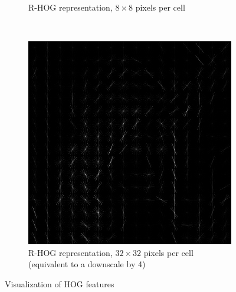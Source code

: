 \begin{figure}[h]
\begin{subfigure}[t]{0.3\textwidth}
        \caption{\acs{R-HOG} representation, $8\times8$ pixels per cell}
        \label{fig:lena_hog:8x8}
    \end{subfigure}
    ~
    \begin{subfigure}[t]{0.3\textwidth}
        \includegraphics[width=\textwidth]{images/lena_hog_32x32}
        \caption{\acs{R-HOG} representation, $32\times32$ pixels per cell (equivalent to a downscale by 4)}
        \label{fig:lena_hog:32x32}
    \end{subfigure}
    \caption{Visualization of \ac{HOG} features}
    \label{fig:lena_hog}
\end{figure}